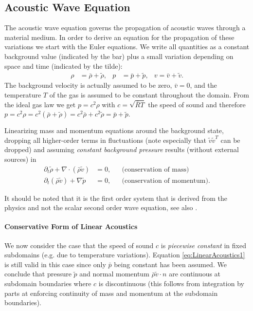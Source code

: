 \documentclass[a4paper,12pt]{article}
\theoremstyle{definition}
\theoremstyle{definition}
\begin{document}
\subsection{Acoustic Wave Equation}\label{sec:SoundWaves}


The acoustic wave equation governs the propagation of acoustic waves through a material medium. In order to derive an equation for the propagation of these variations we start with
the Euler equations. We write all quantities as a constant background value (indicated by the bar)
plus a small variation depending on space and time (indicated by the tilde):
\begin{align*}
\rho &= \bar\rho + \tilde\rho,  & p &= \bar{p} + \tilde{p}, & v = \bar{v} + \tilde{v}.
\end{align*}
The background velocity is actually assumed to be zero, $\bar{v}=0$, and the temperature $T$
of the gas is assumed to be constant throughout the domain. From the ideal gas law we get
$p = c^2 \rho$ with $c=\sqrt{\bar{R}T}$ the speed of sound
and therefore $p= c^2 \rho = c^2(\bar{\rho} + \tilde{\rho}) = c^2\bar{\rho} + c^2\tilde{\rho} = \bar{p} + \tilde{p}$.

Linearizing mass and momentum equations around the background state,
dropping all higher-order terms in fluctuations (note especially
that $\tilde{v}\tilde{v}^T$ can be dropped) and assuming \textit{constant background pressure}
results (without external sources) in
\begin{subequations}\label{eq:LinearAcoustics1}
\begin{align}
\partial_t \tilde{\rho} +  \nabla\cdot(\bar{\rho} \tilde{v}) &= 0, &&\text{(conservation of mass)}\\
\partial_t (\bar\rho \tilde{v}) + \nabla \tilde{p} &= 0, &&\text{(conservation of momentum)}.
\end{align}
\end{subequations}

It should be noted that it is the first order system that is derived from the physics and not
the scalar second order wave equation, see also \cite[§ 2.7]{LeVeque}.

\paragraph{Conservative Form of Linear Acoustics}

We now consider the case that the speed of sound $c$ is \textit{piecewise constant} in
fixed subdomains (e.g. due to temperature variations).
Equation \eqref{eq:LinearAcoustics1} is still valid in this case since only
$\bar{p}$ being constant has been assumed.
We conclude that pressure $\tilde{p}$ and normal momentum
$\bar{\rho} \tilde{v}\cdot n$ are continuous
at subdomain boundaries where $c$ is discontinuous (this follows from integration by parts
at enforcing continuity of mass and momentum at the subdomain boundaries).
\end{document}
